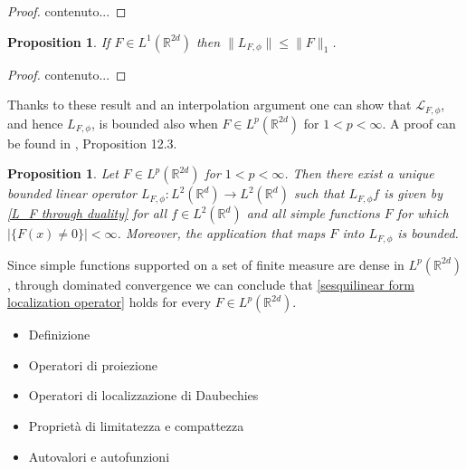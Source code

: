 \documentclass[corpo=11pt, stile=classica, tipotesi=custom,
greek, evenboxes, english]{toptesi}
\numberwithin{equation}{chapter}
\newtheorem{prop}[teo]{Proposition}
\newcommand{\R}{\mathbb{R}} %
\renewcommand{\L}{\mathscr{L}} %
\begin{document}
\begin{proof}
	contenuto...
\end{proof}
\begin{prop}\label{F integrable L_F bounded}
	If $F \in L^1(\R^{2d})$ then $\| L_{F,\phi}\| \leq \| F \|_1$.
\end{prop}
\begin{proof}
	contenuto...
\end{proof}
Thanks to these result and an interpolation argument one can show that $\L_{F,\phi}$, and hence $L_{F,\phi}$, is bounded also when $F \in L^p(\R^{2d})$ for $1 < p < \infty$. A proof can be found in \cite{wong}, Proposition 12.3.
\begin{prop}\label{F in Lp L_F bounded}
	Let $F \in L^p(\R^{2d})$ for $1 < p < \infty$. Then there exist a unique bounded linear operator $L_{F,\phi} : L^2(\R^d) \rightarrow L^2(\R^d)$ such that $L_{F,\phi} f$ is given by \eqref{L_F through duality} for all $f \in L^2(\R^d)$ and all simple functions $F$ for which $|\{F(x) \neq 0\}| < \infty$. Moreover, the application that maps $F$ into $L_{F,\phi}$ is bounded.
\end{prop}
{\color{blue} Since simple functions supported on a set of finite measure are dense in $L^p(\R^{2d})$, through dominated convergence we can conclude that \eqref{sesquilinear form localization operator} holds for every $F \in L^p(\R^{2d})$.}
\begin{itemize}
	\item Definizione
	\item Operatori di proiezione
	\item Operatori di localizzazione di Daubechies
	\item Proprietà di limitatezza e compattezza
	\item Autovalori e autofunzioni
\end{itemize}
\end{document}
